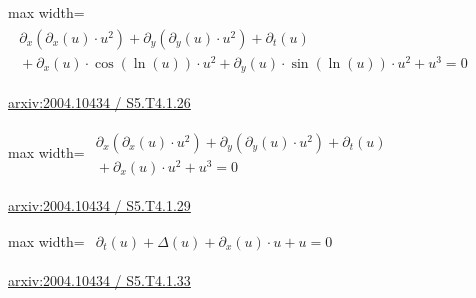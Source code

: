 \documentclass[10pt,a4paper]{article}
\begin{document}
\begin{minipage}{\linewidth}
\begin{center}\begin{adjustbox}{max width=\linewidth}$\displaystyle\begin{gathered}\begin{gathered}\partial_{x}(\partial_{x}(u)\cdot u^{2})+\partial_{y}(\partial_{y}(u)\cdot u^{2})+\partial_{t}(u)\\[-1pt]{}+\partial_{x}(u)\cdot \cos(\ln(u))\cdot u^{2}+\partial_{y}(u)\cdot \sin(\ln(u))\cdot u^{2}+u^{3}=0\end{gathered}\end{gathered}$\end{adjustbox}\end{center}
{\small \href{https://arxiv.org/html/2004.10434#S5.T4.1.26}{arxiv:2004.10434 / S5.T4.1.26}}\par
\end{minipage}\par\vspace{7mm}

\begin{minipage}{\linewidth}
\begin{center}\begin{adjustbox}{max width=\linewidth}$\displaystyle\begin{gathered}\begin{gathered}\partial_{x}(\partial_{x}(u)\cdot u^{2})+\partial_{y}(\partial_{y}(u)\cdot u^{2})+\partial_{t}(u)\\[-1pt]{}+\partial_{x}(u)\cdot u^{2}+u^{3}=0\end{gathered}\end{gathered}$\end{adjustbox}\end{center}
{\small \href{https://arxiv.org/html/2004.10434#S5.T4.1.29}{arxiv:2004.10434 / S5.T4.1.29}}\par
\end{minipage}\par\vspace{7mm}

\begin{minipage}{\linewidth}
\begin{center}\begin{adjustbox}{max width=\linewidth}$\displaystyle\begin{gathered}\begin{gathered}\partial_{t}(u)+\Delta(u)+\partial_{x}(u)\cdot u+u=0\end{gathered}\end{gathered}$\end{adjustbox}\end{center}
{\small \href{https://arxiv.org/html/2004.10434#S5.T4.1.33}{arxiv:2004.10434 / S5.T4.1.33}}\par
\end{minipage}\par\vspace{7mm}
\end{document}
